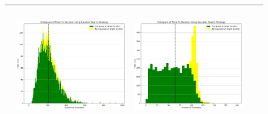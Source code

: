 \begin{landscape}
\begin{table}[h!]
\begin{tabular}{ | c | c | c | c | c |}
\begin{minipage}[c][58mm][c]{49mm}
    \end{minipage}
    &
    \begin{minipage}[c][58mm][c]{49mm}
      \includegraphics[width=49mm, height=52mm]{Chapters/MultiAgentTargetDetection/Figs/Histograms/MultipleAgent/3/SingleAgentSingleSource3RandomHistogram.png}
    \end{minipage}
    &
    \begin{minipage}[c][58mm][c]{49mm}
      \includegraphics[width=49mm, height=52mm]{Chapters/MultiAgentTargetDetection/Figs/Histograms/MultipleAgent/3/SingleAgentSingleSource3SaccadicHistogram.png}
    \end{minipage}
    \\
    \hline
   
  \end{tabular}
  \label{table:HistVaryingNoSearchAgents}
\end{table}


\end{landscape}
